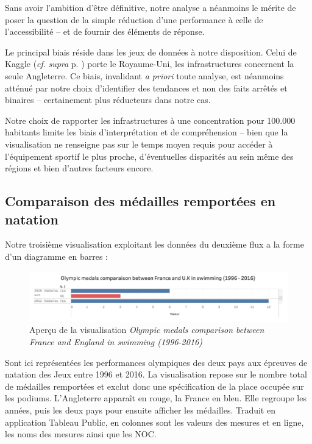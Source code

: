 \documentclass[hidelinks, 12pt]{report}
\begin{document}
Sans avoir l'ambition d'être définitive, notre analyse a néanmoins le mérite de poser la question de la simple réduction d'une performance à celle de l'accessibilité -- et de fournir des éléments de réponse.

Le principal biais réside dans les jeux de données à notre disposition. Celui de Kaggle (\textit{cf}. \textit{supra} p. \pageref{kaggle}) porte le Royaume-Uni, les infrastructures concernent la seule Angleterre. Ce biais, invalidant \textit{a priori} toute analyse, est néanmoins atténué par notre choix d'identifier des tendances et non des faits arrêtés et binaires -- certainement plus réducteurs dans notre cas. 

Notre choix de rapporter les infrastructures à une concentration pour 100.000 habitants limite les biais d'interprétation et de compréhension -- bien que la visualisation ne renseigne pas sur le temps moyen requis pour accéder à l'équipement sportif le plus proche, d'éventuelles disparités au sein même des régions et bien d'autres facteurs encore.

\subsection{Comparaison des médailles remportées en natation}

Notre troisième visualisation exploitant les données du deuxième flux a la forme d'un diagramme en barres :

\begin{center}
	\begin{figure}[H]
		\centering
		\setlength{\belowcaptionskip}{-35pt}
		\includegraphics[scale=0.4]{images/datavis-swim-fr-eng-medals.png}
		\captionsetup{justification=centering}
		\caption{Aperçu de la visualisation \textit{Olympic medals comparison between France and England in swimming (1996-2016)}}
	\end{figure}
\end{center}

Sont ici représentées les performances olympiques des deux pays aux épreuves de natation des Jeux entre 1996 et 2016. La visualisation repose sur le nombre total de médailles remportées et exclut donc une spécification de la place occupée sur les podiums. L'Angleterre apparaît en rouge, la France en bleu. Elle regroupe les années, puis les deux pays pour ensuite afficher les médailles. Traduit en application Tableau Public, en colonnes sont les valeurs des mesures et en ligne, les noms des mesures ainsi que les NOC.
\end{document}
